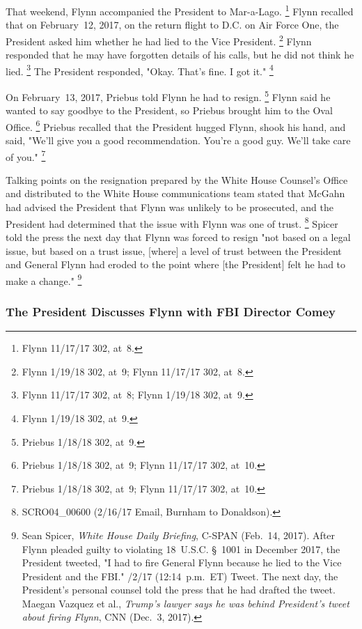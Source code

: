 That weekend, Flynn accompanied the President to Mar-a-Lago.%
\footnote{Flynn 11/17/17 302, at~8.}
Flynn recalled that on February~12, 2017, on the return flight to D.C. on Air Force One, the President asked him whether he had lied to the Vice President.%
\footnote{Flynn 1/19/18 302, at~9;
Flynn 11/17/17 302, at~8.}
Flynn responded that he may have forgotten details of his calls, but he did not think he lied.%
\footnote{Flynn 11/17/17 302, at~8;
Flynn 1/19/18 302, at~9.}
The President responded, "Okay.
That's fine.
I got it."%
\footnote{Flynn 1/19/18 302, at~9.}

On February~13, 2017, Priebus told Flynn he had to resign.%
\footnote{Priebus 1/18/18 302, at~9.}
Flynn said he wanted to say goodbye to the President, so Priebus brought him to the Oval Office.%
\footnote{Priebus 1/18/18 302, at~9;
Flynn 11/17/17 302, at~10.}
Priebus recalled that the President hugged Flynn, shook his hand, and said, "We'll give you a good recommendation.
You're a good guy.
We'll take care of you."%
\footnote{Priebus 1/18/18 302, at~9;
Flynn 11/17/17 302, at~10.}

Talking points on the resignation prepared by the White House Counsel's Office and distributed to the White House communications team stated that McGahn had advised the President that Flynn was unlikely to be prosecuted, and the President had determined that the issue with Flynn was one of trust.%
\footnote{SCRO04\_00600 (2/16/17 Email, Burnham to Donaldson).}
Spicer told the press the next day that Flynn was forced to resign "not based on a legal issue, but based on a trust issue, [where] a level of trust between the President and General Flynn had eroded to the point where [the President] felt he had to make a change."%
\footnote{Sean Spicer, \textit{White House Daily Briefing}, C-SPAN (Feb.~14, 2017).
After Flynn pleaded guilty to violating 18~U.S.C. \S~1001 in December 2017, the President tweeted, "I had to fire General Flynn because he lied to the Vice President and the FBI."
/2/17 (12:14~p.m.~ET) Tweet.
The next day, the President's personal counsel told the press that he had drafted the tweet.
Maegan Vazquez et al., \textit{Trump's lawyer says he was behind President's tweet about firing Flynn}, CNN (Dec.~3, 2017).}

\subsubsection{The President Discusses Flynn with FBI Director Comey}

